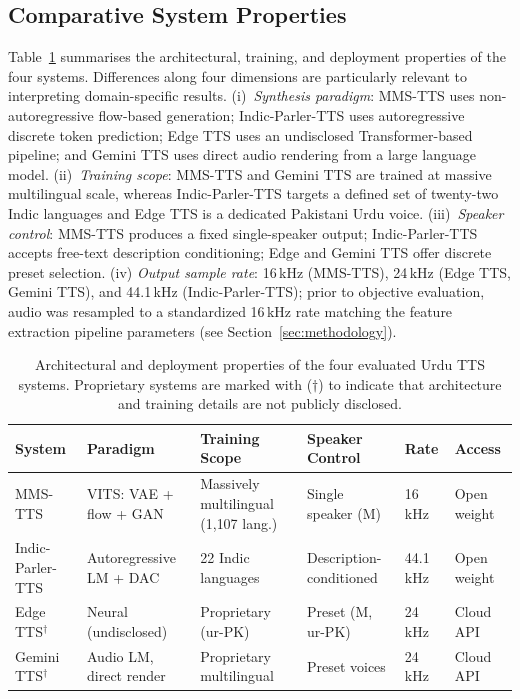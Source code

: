 \documentclass[a4paper,fleqn]{cas-dc}
\begin{document}
    \subsection{Comparative System Properties}\label{sec:systems-comparison}
    
    Table~\ref{tbl:systems} summarises the architectural, training, and deployment
    properties of the four systems. Differences along four dimensions are
    particularly relevant to interpreting domain-specific results. (i)~\emph{Synthesis
    paradigm}: MMS-TTS uses non-autoregressive flow-based generation; Indic-Parler-TTS
    uses autoregressive discrete token prediction; Edge TTS uses an undisclosed
    Transformer-based pipeline; and Gemini TTS uses direct audio rendering from
    a large language model. (ii)~\emph{Training scope}: MMS-TTS and Gemini TTS
    are trained at massive multilingual scale, whereas Indic-Parler-TTS targets
    a defined set of twenty-two Indic languages and Edge TTS is a dedicated
    Pakistani Urdu voice. (iii)~\emph{Speaker control}: MMS-TTS produces a fixed
    single-speaker output; Indic-Parler-TTS accepts free-text description
    conditioning; Edge and Gemini TTS offer discrete preset selection. (iv)
    \emph{Output sample rate}: 16\,kHz (MMS-TTS), 24\,kHz (Edge TTS, Gemini
    TTS), and 44.1\,kHz (Indic-Parler-TTS); prior to objective evaluation, audio was resampled to a standardized 16\,kHz rate matching the feature extraction pipeline parameters (see Section~\ref{sec:methodology}).
    
    \begin{table}[!htbp]
    \caption{Architectural and deployment properties of the four evaluated Urdu TTS
    systems. Proprietary systems are marked with ($\dagger$) to indicate that
    architecture and training details are not publicly disclosed.}\label{tbl:systems}
    \small
    \begin{tabular*}{\textwidth}{@{}p{2.2cm}p{3.8cm}p{3.2cm}p{2.8cm}p{1.4cm}p{1.8cm}@{}}
    \toprule
    \textbf{System} & \textbf{Paradigm} & \textbf{Training Scope} & 
    \textbf{Speaker Control} & \textbf{Rate} & \textbf{Access} \\
    \midrule
    MMS-TTS
      & VITS: VAE + flow + GAN \citep{kim2021vits}
      & Massively multilingual (1{,}107 lang.)
      & Single speaker (M)
      & 16\,kHz
      & Open weight \\[6pt]
    Indic-Parler-TTS
      & Autoregressive LM + DAC \citep{lacombe2024parlertts}
      & 22 Indic languages
      & Description-conditioned
      & 44.1\,kHz
      & Open weight \\[6pt]
    Edge TTS$^\dagger$
      & Neural (undisclosed) \citep{microsoft2023azure}
      & Proprietary (ur-PK)
      & Preset (M, ur-PK)
      & 24\,kHz
      & Cloud API \\[6pt]
    Gemini TTS$^\dagger$
      & Audio LM, direct render \citep{google2025gemini}
      & Proprietary multilingual
      & Preset voices
      & 24\,kHz
      & Cloud API \\
    \bottomrule
    \end{tabular*}
    \end{table}
    
\end{document}
